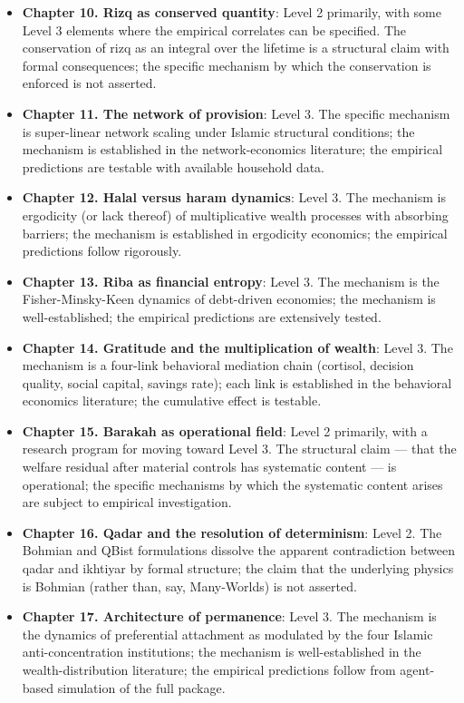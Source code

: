 \begin{itemize}[leftmargin=2em]
    \item \textbf{Chapter 10. Rizq as conserved quantity}: Level 2
    primarily, with some Level 3 elements where the empirical
    correlates can be specified. The conservation of rizq as an
    integral over the lifetime is a structural claim with formal
    consequences; the specific mechanism by which the conservation
    is enforced is not asserted.
    \item \textbf{Chapter 11. The network of provision}: Level 3.
    The specific mechanism is super-linear network scaling under
    Islamic structural conditions; the mechanism is established in
    the network-economics literature; the empirical predictions are
    testable with available household data.
    \item \textbf{Chapter 12. Halal versus haram dynamics}: Level 3.
    The mechanism is ergodicity (or lack thereof) of multiplicative
    wealth processes with absorbing barriers; the mechanism is
    established in ergodicity economics; the empirical predictions
    follow rigorously.
    \item \textbf{Chapter 13. Riba as financial entropy}: Level 3.
    The mechanism is the Fisher-Minsky-Keen dynamics of debt-driven
    economies; the mechanism is well-established; the empirical
    predictions are extensively tested.
    \item \textbf{Chapter 14. Gratitude and the multiplication of
    wealth}: Level 3. The mechanism is a four-link behavioral
    mediation chain (cortisol, decision quality, social capital,
    savings rate); each link is established in the behavioral
    economics literature; the cumulative effect is testable.
    \item \textbf{Chapter 15. Barakah as operational field}: Level 2
    primarily, with a research program for moving toward Level 3.
    The structural claim --- that the welfare residual after material
    controls has systematic content --- is operational; the specific
    mechanisms by which the systematic content arises are subject to
    empirical investigation.
    \item \textbf{Chapter 16. Qadar and the resolution of
    determinism}: Level 2. The Bohmian and QBist formulations
    dissolve the apparent contradiction between qadar and ikhtiyar
    by formal structure; the claim that the underlying physics is
    Bohmian (rather than, say, Many-Worlds) is not asserted.
    \item \textbf{Chapter 17. Architecture of permanence}: Level 3.
    The mechanism is the dynamics of preferential attachment as
    modulated by the four Islamic anti-concentration institutions;
    the mechanism is well-established in the wealth-distribution
    literature; the empirical predictions follow from agent-based
    simulation of the full package.
\end{itemize}

